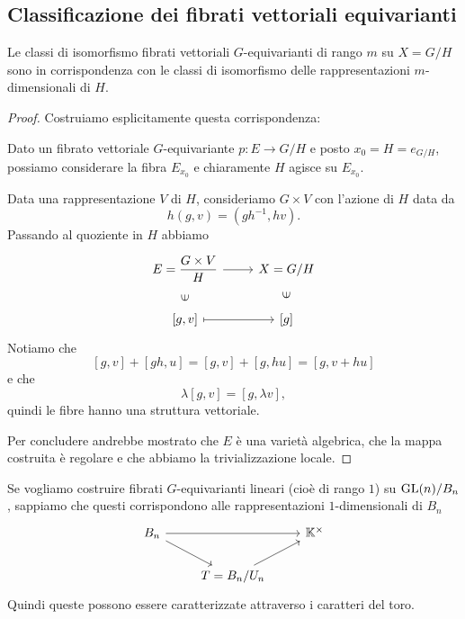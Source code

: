 \subsection{Classificazione dei fibrati vettoriali equivarianti}
\begin{proposition}\label{PrClassificazioneFibratiSuGruppoQuoziente}
Le classi di isomorfismo fibrati vettoriali $G$-equivarianti di rango $m$ su $X=G/H$ sono in corrispondenza con le classi di isomorfismo delle rappresentazioni $m$-dimensionali di $H$.
\end{proposition}
\begin{proof}
Costruiamo esplicitamente questa corrispondenza:
\smallskip

\noindent
Dato un fibrato vettoriale $G$-equivariante $p\colon E\to G/H$ e posto $x_0=H=e_{G/H}$, possiamo considerare la fibra $E_{x_0}$ e chiaramente $H$ agisce su $E_{x_0}$. 
\smallskip

\noindent
Data una rappresentazione $V$ di $H$, consideriamo $G\times V$ con l'azione di $H$ data da 
\[h(g,v)=(gh^{-1},hv).\]
Passando al quoziente in $H$ abbiamo
\[\begin{tikzcd}
	{E=\dfrac{G\times V}{H}} & {X={G}/{H}} \\
	{[g,v]} & {[g]}
	\arrow[from=1-1, to=1-2]
	\arrow["\in"{marking, allow upside down}, draw=none, from=2-1, to=1-1]
	\arrow[maps to, from=2-1, to=2-2]
	\arrow["\in"{marking, allow upside down}, draw=none, from=2-2, to=1-2]
\end{tikzcd}\]
Notiamo che 
\[[g,v]+[gh,u]=[g,v]+[g,hu]=[g,v+hu]\] 
e che 
\[\lambda[g,v]=[g,\lambda v],\]
quindi le fibre hanno una struttura vettoriale.

Per concludere andrebbe mostrato che $E$ è una varietà algebrica, che la mappa costruita è regolare e che abbiamo la trivializzazione locale.
\end{proof}



\begin{example}
Se vogliamo costruire fibrati $G$-equivarianti lineari (cioè di rango $1$) su $\mathrm{GL}(n)/B_n$, sappiamo che questi corrispondono alle rappresentazioni $1$-dimensionali di $B_n$ 
\[\begin{tikzcd}
	{B_n} && {\K^\times} \\
	& {T=B_n/U_n}
	\arrow[from=1-1, to=1-3]
	\arrow[from=1-1, to=2-2]
	\arrow[from=2-2, to=1-3]
\end{tikzcd}\]
Quindi queste possono essere caratterizzate attraverso i caratteri del toro.
\end{example}


